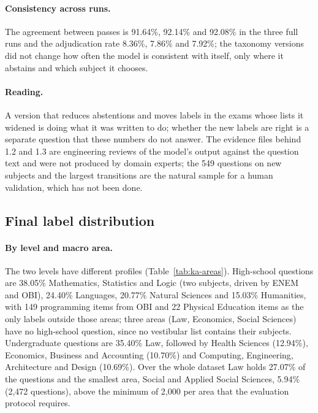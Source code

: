 \paragraph{Consistency across runs.} The agreement between passes is
91.64\%, 92.14\% and 92.08\% in the three full runs and the adjudication
rate 8.36\%, 7.86\% and 7.92\%; the taxonomy versions did not change how
often the model is consistent with itself, only where it abstains and which
subject it chooses.

\paragraph{Reading.} A version that reduces abstentions and moves labels in
the exams whose lists it widened is doing what it was written to do; whether
the new labels are right is a separate question that these numbers do not
answer. The evidence files behind 1.2 and 1.3 are engineering reviews of the
model's output against the question text and were not produced by domain
experts; the 549 questions on new subjects and the largest transitions are the
natural sample for a human validation, which has not been done.

\subsection{Final label distribution}
\label{app:ka-distribution}

\paragraph{By level and macro area.} The two levels have different
profiles (Table~\ref{tab:ka-areas}). High-school questions are 38.05\%
Mathematics, Statistics and Logic (two subjects, driven by ENEM and OBI),
24.40\% Languages, 20.77\% Natural Sciences and 15.03\% Humanities, with 149
programming items from OBI and 22 Physical Education items as the only
labels outside those areas; three areas (Law, Economics, Social Sciences)
have no high-school question, since no vestibular list contains their
subjects. Undergraduate questions are 35.40\% Law, followed by Health
Sciences (12.94\%), Economics, Business and Accounting (10.70\%) and
Computing, Engineering, Architecture and Design (10.69\%). Over the whole
dataset Law holds 27.07\% of the questions and the smallest area, Social and
Applied Social Sciences, 5.94\% (2,472 questions), above the minimum of
2,000 per area that the evaluation protocol requires.

